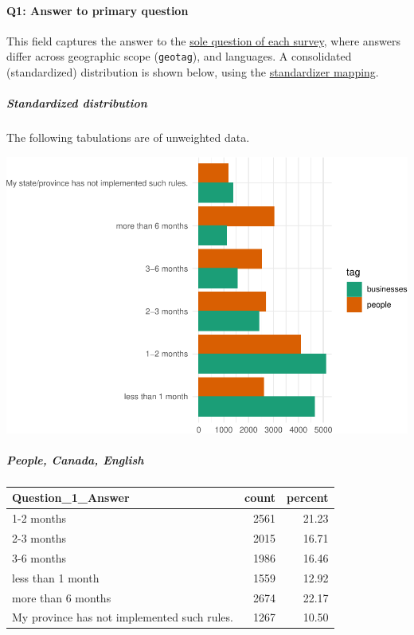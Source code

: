 \documentclass[
]{article}
\begin{document}
\hypertarget{q1-answer-to-primary-question}{%
\paragraph{Q1: Answer to primary
question}\label{q1-answer-to-primary-question}}

This field captures the answer to the
\protect\hyperlink{question-type}{sole question of each survey}, where
answers differ across geographic scope (\texttt{geotag}), and languages.
A consolidated (standardized) distribution is shown below, using the
\href{auxiliary/standardize_values.xlsx}{standardizer mapping}.

\hypertarget{standardized-distribution}{%
\subparagraph{Standardized
distribution}\label{standardized-distribution}}

The following tabulations are of unweighted data.

\includegraphics{expectations-codebook_files/figure-latex/graph-1.pdf}

\hypertarget{people-canada-english}{%
\subparagraph{People, Canada, English}\label{people-canada-english}}

\begin{longtable}[]{@{}lrr@{}}
\toprule
Question\_1\_Answer & count & percent \\
\midrule
\endhead
1-2 months & 2561 & 21.23 \\
2-3 months & 2015 & 16.71 \\
3-6 months & 1986 & 16.46 \\
less than 1 month & 1559 & 12.92 \\
more than 6 months & 2674 & 22.17 \\
My province has not implemented such rules. & 1267 & 10.50 \\
\bottomrule
\end{longtable}
\end{document}

